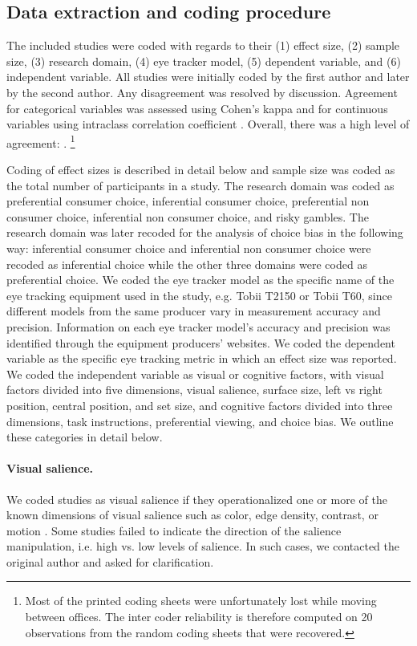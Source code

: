 \documentclass[english,natbib,man,floatsintext]{apa6}
\begin{document}
\subsection{Data extraction and coding procedure}

The included studies were coded with regards to their (1) effect size, (2) sample size, (3) research domain, (4) eye tracker model, (5) dependent variable, and (6) independent variable. All studies were initially coded by the first author and later by the second author. Any disagreement was resolved by discussion. Agreement for categorical variables was assessed using Cohen's kappa and for continuous variables using intraclass correlation coefficient \citep{shrout1979a}. Overall, there was a high level of agreement: .%
%
\footnote{Most of the printed coding sheets were unfortunately lost while moving between offices. The inter coder reliability is therefore computed on 20 observations from the random coding sheets that were recovered.}

Coding of effect sizes is described in detail below and sample size was coded as the total number of participants in a study. The research domain was coded as preferential consumer choice, inferential consumer choice, preferential non consumer choice, inferential non consumer choice, and risky gambles. The research domain was later recoded for the analysis of choice bias in the following way: inferential consumer choice and inferential non consumer choice were recoded as inferential choice while the other three domains were coded as preferential choice. We coded the eye tracker model as the specific name of the eye tracking equipment used in the study, e.g. Tobii T2150 or Tobii T60, since different models from the same producer vary in measurement accuracy and precision. Information on each eye tracker model's accuracy and precision was identified through the equipment producers' websites. We coded the dependent variable as the specific eye tracking metric in which an effect size was reported. We coded the independent variable as visual or cognitive factors, with visual factors divided into five dimensions, visual salience, surface size, left vs right position, central position, and set size, and cognitive factors divided into three dimensions, task instructions, preferential viewing, and choice bias. We outline these categories in detail below. 

\paragraph{Visual salience.} We coded studies as visual salience if they operationalized one or more of the known dimensions of visual salience such as color, edge density, contrast, or motion \citep{itti2000}. Some studies failed to indicate the direction of the salience manipulation, i.e. high vs. low levels of salience. In such cases, we contacted the original author and asked for clarification.
\end{document}
